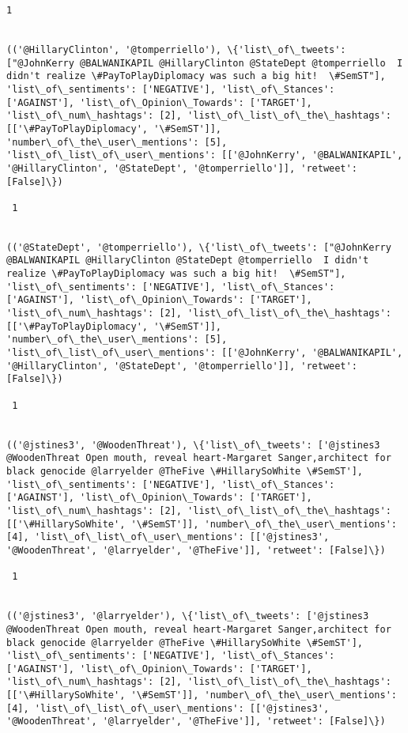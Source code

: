 \documentclass[11pt]{article}
\begin{document}
\begin{Verbatim}[commandchars=\\\{\}]
 1
 

(('@HillaryClinton', '@tomperriello'), \{'list\_of\_tweets': ["@JohnKerry @BALWANIKAPIL @HillaryClinton @StateDept @tomperriello  I didn't realize \#PayToPlayDiplomacy was such a big hit!  \#SemST"], 'list\_of\_sentiments': ['NEGATIVE'], 'list\_of\_Stances': ['AGAINST'], 'list\_of\_Opinion\_Towards': ['TARGET'], 'list\_of\_num\_hashtags': [2], 'list\_of\_list\_of\_the\_hashtags': [['\#PayToPlayDiplomacy', '\#SemST']], 'number\_of\_the\_user\_mentions': [5], 'list\_of\_list\_of\_user\_mentions': [['@JohnKerry', '@BALWANIKAPIL', '@HillaryClinton', '@StateDept', '@tomperriello']], 'retweet': [False]\})

 1
 

(('@StateDept', '@tomperriello'), \{'list\_of\_tweets': ["@JohnKerry @BALWANIKAPIL @HillaryClinton @StateDept @tomperriello  I didn't realize \#PayToPlayDiplomacy was such a big hit!  \#SemST"], 'list\_of\_sentiments': ['NEGATIVE'], 'list\_of\_Stances': ['AGAINST'], 'list\_of\_Opinion\_Towards': ['TARGET'], 'list\_of\_num\_hashtags': [2], 'list\_of\_list\_of\_the\_hashtags': [['\#PayToPlayDiplomacy', '\#SemST']], 'number\_of\_the\_user\_mentions': [5], 'list\_of\_list\_of\_user\_mentions': [['@JohnKerry', '@BALWANIKAPIL', '@HillaryClinton', '@StateDept', '@tomperriello']], 'retweet': [False]\})

 1
 

(('@jstines3', '@WoodenThreat'), \{'list\_of\_tweets': ['@jstines3 @WoodenThreat Open mouth, reveal heart-Margaret Sanger,architect for black genocide @larryelder @TheFive \#HillarySoWhite \#SemST'], 'list\_of\_sentiments': ['NEGATIVE'], 'list\_of\_Stances': ['AGAINST'], 'list\_of\_Opinion\_Towards': ['TARGET'], 'list\_of\_num\_hashtags': [2], 'list\_of\_list\_of\_the\_hashtags': [['\#HillarySoWhite', '\#SemST']], 'number\_of\_the\_user\_mentions': [4], 'list\_of\_list\_of\_user\_mentions': [['@jstines3', '@WoodenThreat', '@larryelder', '@TheFive']], 'retweet': [False]\})

 1
 

(('@jstines3', '@larryelder'), \{'list\_of\_tweets': ['@jstines3 @WoodenThreat Open mouth, reveal heart-Margaret Sanger,architect for black genocide @larryelder @TheFive \#HillarySoWhite \#SemST'], 'list\_of\_sentiments': ['NEGATIVE'], 'list\_of\_Stances': ['AGAINST'], 'list\_of\_Opinion\_Towards': ['TARGET'], 'list\_of\_num\_hashtags': [2], 'list\_of\_list\_of\_the\_hashtags': [['\#HillarySoWhite', '\#SemST']], 'number\_of\_the\_user\_mentions': [4], 'list\_of\_list\_of\_user\_mentions': [['@jstines3', '@WoodenThreat', '@larryelder', '@TheFive']], 'retweet': [False]\})


\end{Verbatim}
\end{document}
